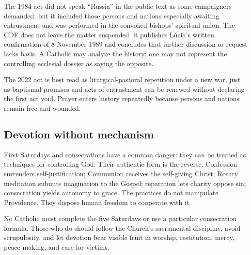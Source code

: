 The 1984 act did not speak “Russia” in the public text as some campaigners demanded, but it included those persons and nations especially awaiting entrustment and was performed in the convoked bishops' spiritual union. The CDF does not leave the matter suspended: it publishes Lúcia's written confirmation of 8 November 1989 and concludes that further discussion or request lacks basis. A Catholic may analyze the history; one may not represent the controlling ecclesial dossier as saying the opposite.

The 2022 act is best read as liturgical-pastoral repetition under a new war, just as baptismal promises and acts of entrustment can be renewed without declaring the first act void. Prayer enters history repeatedly because persons and nations remain free and wounded.

\subsection{Devotion without mechanism}

First Saturdays and consecrations have a common danger: they can be treated as techniques for controlling God. Their authentic form is the reverse. Confession surrenders self-justification; Communion receives the self-giving Christ; Rosary meditation submits imagination to the Gospel; reparation lets charity oppose sin; consecration yields autonomy to grace. The practices do not manipulate Providence. They dispose human freedom to cooperate with it.

No Catholic must complete the five Saturdays or use a particular consecration formula. Those who do should follow the Church's sacramental discipline, avoid scrupulosity, and let devotion bear visible fruit in worship, restitution, mercy, peace-making, and care for victims.

